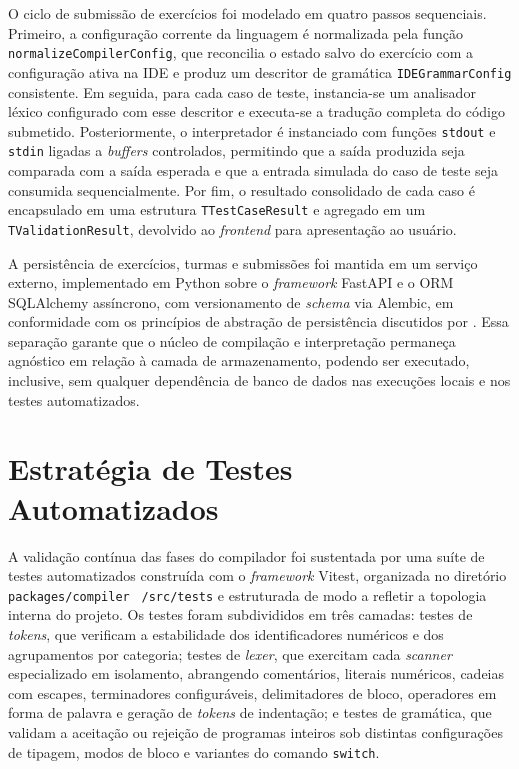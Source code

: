 O ciclo de submissão de exercícios foi modelado em quatro passos sequenciais. Primeiro, a configuração corrente da linguagem é normalizada pela função \texttt{normalizeCompiler}\allowbreak\texttt{Config}, que reconcilia o estado salvo do exercício com a configuração ativa na IDE e produz um descritor de gramática \texttt{IDEGrammarConfig} consistente. Em seguida, para cada caso de teste, instancia-se um analisador léxico configurado com esse descritor e executa-se a tradução completa do código submetido. Posteriormente, o interpretador é instanciado com funções \texttt{stdout} e \texttt{stdin} ligadas a \textit{buffers} controlados, permitindo que a saída produzida seja comparada com a saída esperada e que a entrada simulada do caso de teste seja consumida sequencialmente. Por fim, o resultado consolidado de cada caso é encapsulado em uma estrutura \texttt{TTestCaseResult} e agregado em um \texttt{TValidationResult}, devolvido ao \textit{frontend} para apresentação ao usuário.

A persistência de exercícios, turmas e submissões foi mantida em um serviço externo, implementado em Python sobre o \textit{framework} FastAPI e o ORM SQLAlchemy assíncrono, com versionamento de \textit{schema} via Alembic, em conformidade com os princípios de abstração de persistência discutidos por . Essa separação garante que o núcleo de compilação e interpretação permaneça agnóstico em relação à camada de armazenamento, podendo ser executado, inclusive, sem qualquer dependência de banco de dados nas execuções locais e nos testes automatizados.

\section{Estratégia de Testes Automatizados}
\label{sec:metodologia-testes}

A validação contínua das fases do compilador foi sustentada por uma suíte de testes automatizados construída com o \textit{framework} Vitest, organizada no diretório \texttt{packages/compiler } \texttt{/src/tests} e estruturada de modo a refletir a topologia interna do projeto. Os testes foram subdivididos em três camadas: testes de \textit{tokens}, que verificam a estabilidade dos identificadores numéricos e dos agrupamentos por categoria; testes de \textit{lexer}, que exercitam cada \textit{scanner} especializado em isolamento, abrangendo comentários, literais numéricos, cadeias com escapes, terminadores configuráveis, delimitadores de bloco, operadores em forma de palavra e geração de \textit{tokens} de indentação; e testes de gramática, que validam a aceitação ou rejeição de programas inteiros sob distintas configurações de tipagem, modos de bloco e variantes do comando \texttt{switch}.

